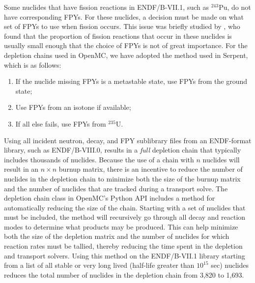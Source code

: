 \documentclass[3p,authoryear]{elsarticle}
\begin{document}
Some nuclides that have fission reactions in ENDF/B-VII.1, such as $^{243}$Pu,
do not have corresponding FPYs. For these nuclides, a decision must be made on
what set of FPYs to use when fission occurs. This issue was briefly studied by
\citet{fensin2015pne}, who found that the proportion of fission reactions that
occur in these nuclides is usually small enough that the choice of FPYs is not
of great importance. For the depletion chains used in OpenMC, we have adopted
the method used in Serpent, which is as follows:
\begin{enumerate}
  \item If the nuclide missing FPYs is a metastable state, use FPYs from the
  ground state;
  \item Use FPYs from an isotone if available;
  \item If all else fails, use FPYs from $^{235}$U.
\end{enumerate}

Using all incident neutron, decay, and FPY sublibrary files from an ENDF-format
library, such as ENDF/B-VIII.0, results in a \emph{full} depletion chain that
typically includes thousands of nuclides. Because the use of a chain with $n$
nuclides will result in an $n\times n$ burnup matrix, there is an incentive to
reduce the number of nuclides in the depletion chain to minimize both the size
of the burnup matrix and the number of nuclides that are tracked during a
transport solve. The depletion chain class in OpenMC's Python API includes a
method for automatically reducing the size of the chain. Starting with a set of
nuclides that must be included, the method will recursively go through all decay
and reaction modes to determine what products may be produced. This can help
minimize both the size of the depletion matrix and the number of nuclides for
which reaction rates must be tallied, thereby reducing the time spent in the
depletion and transport solvers. Using this method on the ENDF/B-VII.1 library
starting from a list of all stable or very long lived (half-life greater than
$10^{15}$ sec) nuclides reduces the total number of nuclides in the depletion
chain from 3,820 to 1,693.
\end{document}

